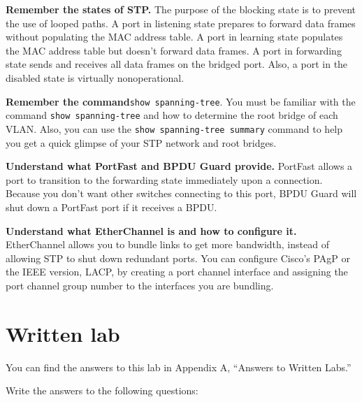 \textbf{Remember the states of STP.} The purpose of the blocking state
is to prevent the use of looped paths. A port in listening state
prepares to forward data frames without populating the MAC address
table. A port in learning state populates the MAC address table but
doesn't forward data frames. A port in forwarding state sends and
receives all data frames on the bridged port. Also, a port in the
disabled state is virtually nonoperational.

\textbf{Remember the command}\texttt{show\ spanning-tree}. You must be
familiar with the command \texttt{show\ spanning-tree} and how to
determine the root bridge of each VLAN. Also, you can use the
\texttt{show\ spanning-tree\ summary} command to help you get a quick
glimpse of your STP network and root bridges.

\textbf{Understand what PortFast and BPDU Guard provide.} PortFast
allows a port to transition to the forwarding state immediately upon a
connection. Because you don't want other switches connecting to this
port, BPDU Guard will shut down a PortFast port if it receives a BPDU.

\textbf{Understand what EtherChannel is and how to configure it.}
EtherChannel allows you to bundle links to get more bandwidth, instead
of allowing STP to shut down redundant ports. You can configure Cisco's
PAgP or the IEEE version, LACP, by creating a port channel interface and
assigning the port channel group number to the interfaces you are
bundling.

\section{Written lab}

You can find the answers to this lab in Appendix A, ``Answers to Written
Labs.''

Write the answers to the following questions:

